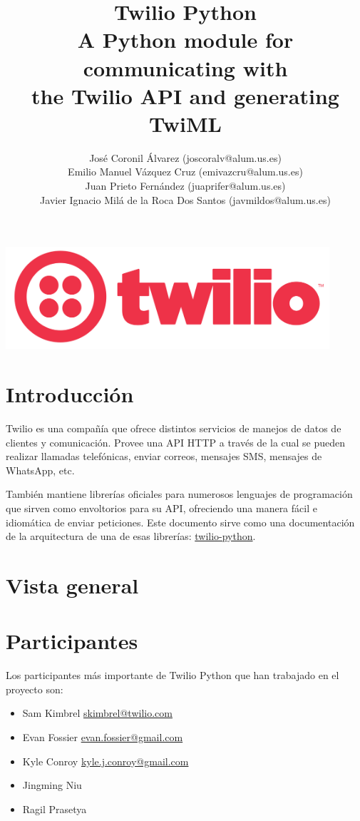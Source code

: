 \documentclass{article}
\title{%
  Twilio Python \\
  \large A Python module for communicating with \\
  the Twilio API and generating TwiML}
\author{José Coronil Álvarez (joscoralv@alum.us.es) \\
Emilio Manuel Vázquez Cruz (emivazcru@alum.us.es) \\
Juan Prieto Fernández (juaprifer@alum.us.es) \\
Javier Ignacio Milá de la Roca Dos Santos (javmildos@alum.us.es) \\}
\date{}
\begin{document}
\begin{titlepage}
  \centering
  \vfill
  {\bfseries\Large
      \thetitle
  }    
  \vfill
  \includegraphics[width=12cm]{logo.png} %
  \vfill
  \theauthor
\end{titlepage}



\section{Introducción}

Twilio es una compañía que ofrece distintos servicios
de manejos de datos de clientes y comunicación.
Provee una API HTTP a través de la cual se pueden realizar llamadas telefónicas,
enviar correos, mensajes SMS, mensajes de WhatsApp, etc.

También mantiene librerías oficiales para numerosos lenguajes de programación
que sirven como envoltorios para su API,
ofreciendo una manera fácil e idiomática de enviar peticiones.
Este documento sirve como una documentación de la arquitectura
de una de esas librerías:
\href{https://github.com/twilio/twilio-python}{twilio-python}.

\section{Vista general}

\section{Participantes}
Los participantes más importante de Twilio Python que han trabajado en el proyecto son:
\begin{itemize}
  \item Sam Kimbrel \href{mailto:skimbrel@twilio.com}{skimbrel@twilio.com}
  \item Evan Fossier \href{mailto:evan.fossier@gmail.com}{evan.fossier@gmail.com}
  \item Kyle Conroy \href{mailto:kyle.j.conroy@gmail.com}{kyle.j.conroy@gmail.com}
  \item Jingming Niu 
  \item Ragil Prasetya 
  
  \end{itemize}
  
\end{document}
